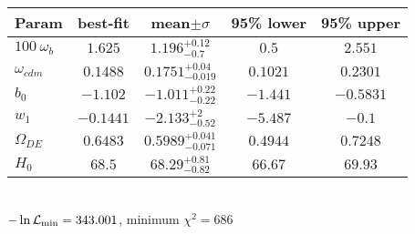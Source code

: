 \begin{tabular}{|l|c|c|c|c|} 
 \hline 
Param & best-fit & mean$\pm\sigma$ & 95\% lower & 95\% upper \\ \hline 
$100~\omega_{b }$ &$1.625$ & $1.196_{-0.7}^{+0.12}$ & $0.5$ & $2.551$ \\ 
$\omega_{cdm }$ &$0.1488$ & $0.1751_{-0.019}^{+0.04}$ & $0.1021$ & $0.2301$ \\ 
$b_{0 }$ &$-1.102$ & $-1.011_{-0.22}^{+0.22}$ & $-1.441$ & $-0.5831$ \\ 
$w_{1 }$ &$-0.1441$ & $-2.133_{-0.52}^{+2}$ & $-5.487$ & $-0.1$ \\ 
$\Omega_{DE}$ &$0.6483$ & $0.5989_{-0.071}^{+0.041}$ & $0.4944$ & $0.7248$ \\ 
$H_{0 }$ &$68.5$ & $68.29_{-0.82}^{+0.81}$ & $66.67$ & $69.93$ \\ 
\hline 
 \end{tabular} \\ 
$-\ln{\cal L}_\mathrm{min} =343.001$, minimum $\chi^2=686$ \\ 

